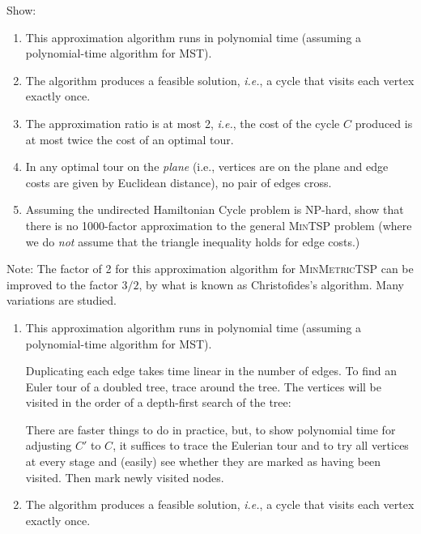 \documentclass[2pt]{scrartcl}
\begin{document}
\begin{multicols}{6}
{Show:
\begin{enumerate}
\item This approximation algorithm runs in polynomial time (assuming a
  polynomial-time algorithm for \textsc{MST}).
\item The algorithm produces a feasible solution, {\em i.e.}, a cycle
  that visits each vertex exactly once.
\item The approximation ratio is at most 2, {\em i.e.}, the cost of
  the cycle $C$ produced is at most twice the cost of an optimal tour.
\item In any optimal tour on the {\em plane} (i.e., vertices are on
  the plane and edge costs are given by Euclidean distance), no pair
  of edges cross.
\item Assuming the undirected Hamiltonian Cycle problem is NP-hard,
  show that there is no 1000-factor approximation to the general
  \textsc{MinTSP} problem (where we do {\em not} assume that the
  triangle inequality holds for edge costs.)
\end{enumerate}

Note: The factor of 2 for this approximation algorithm for
\textsc{MinMetricTSP} can be improved to the factor $3/2$, by what is
known as Christofides's algorithm.  Many variations are studied.}

            \begin{enumerate}
\item This approximation algorithm runs in polynomial time (assuming a
  polynomial-time algorithm for \textsc{MST}).

Duplicating each edge takes time linear in the number of edges.  To
find an Euler tour of a doubled tree, trace around the tree.  The
vertices will be visited in the order of a depth-first search of the
tree:

\vspace*{2in}

There are faster things to do in practice, but, to show polynomial
time for adjusting $C'$ to $C$, it suffices to trace the Eulerian tour
and to try all vertices at every stage and (easily) see whether they
are marked as having been visited.  Then mark newly visited nodes.

\item The algorithm produces a feasible solution, {\em i.e.}, a cycle
  that visits each vertex exactly once.


\end{enumerate}
\end{multicols}
\end{document}
